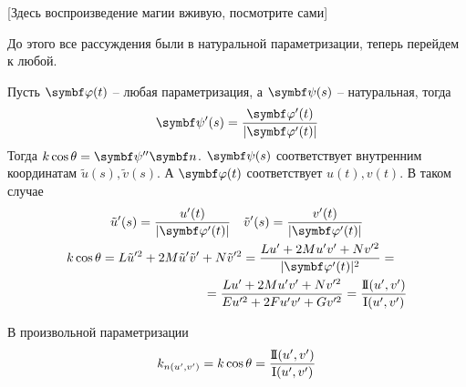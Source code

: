 \documentclass[main]{subfiles}
\begin{document}
[Здесь воспроизведение магии вживую, посмотрите сами]

До этого все рассуждения были в натуральной параметризации, теперь перейдем к любой.

Пусть $\vphi(t)$ -- любая параметризация, а $\vpsi(s)$ -- натуральная, тогда
\[\vpsi'(s) = \frac{\vphi'(t)}{|\vphi'(t)|}\]
Тогда  $k \cos\theta = \vpsi'' \vn$.
$\vpsi(s)$ соответствует внутренним координатам $\tilde{u}(s), \tilde{v}(s)$.
А $\vphi(t)$ соответствует $u(t), v(t)$.
В таком случае
\begin{gather*}
    \tilde{u}'(s) = \frac{u'(t)}{|\vphi'(t)|} \quad \tilde{v}'(s) =\frac{v'(t)}{|\vphi'(t)|}\\
    \begin{multlined}
        k \cos \theta = L \tilde{u}'^2 + 2M \tilde{u}' \tilde{v}' + N \tilde{v}'^2 = \frac{L u' + 2M u'v' + Nv'^2}{|\vphi'(t)|^2} =\\
        = \frac{L u' + 2M u'v' + Nv'^2}{Eu'^2 + 2F u'v' + G v'^2} = \frac{\sff(u',v')}{\fff(u',v')}
    \end{multlined}
\end{gather*}
\begin{theorem}
    В произвольной параметризации
    \[k_{n(u', v')} = k \cos \theta = \frac{\mathrm{I\!I}(u',v')}{\mathrm{I}(u',v')}\]
\end{theorem}
\end{document}
